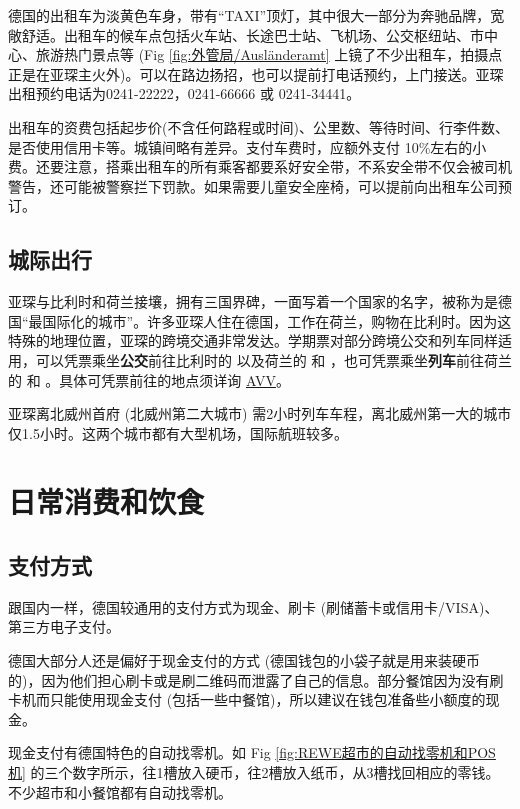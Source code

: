     德国的出租车为淡黄色车身，带有``TAXI''顶灯，其中很大一部分为奔驰品牌，宽敞舒适。出租车的候车点包括火车站、长途巴士站、飞机场、公交枢纽站、市中心、旅游热门景点等 (Fig \ref{fig:外管局/Ausländeramt} 上镜了不少出租车，拍摄点正是在亚琛主火外)。可以在路边扬招，也可以提前打电话预约，上门接送。亚琛出租预约电话为0241-22222，0241-66666 或 0241-34441。

    出租车的资费包括起步价(不含任何路程或时间)、公里数、等待时间、行李件数、是否使用信用卡等。城镇间略有差异。支付车费时，应额外支付 10\%左右的小费。还要注意，搭乘出租车的所有乘客都要系好安全带，不系安全带不仅会被司机警告，还可能被警察拦下罚款。如果需要儿童安全座椅，可以提前向出租车公司预订。

  \subsection{城际出行}\label{subsec:城际出行}

    亚琛与比利时和荷兰接壤，拥有三国界碑，一面写着一个国家的名字，被称为是德国``最国际化的城市''。许多亚琛人住在德国，工作在荷兰，购物在比利时。因为这特殊的地理位置，亚琛的跨境交通非常发达。学期票对部分跨境公交和列车同样适用，可以凭票乘坐\textbf{公交}前往比利时的  以及荷兰的  和 ，也可凭票乘坐\textbf{列车}前往荷兰的  和 。具体可凭票前往的地点须详询 \href{http://www.avv.de/}{AVV}。

    亚琛离北威州首府 (北威州第二大城市) 需2小时列车车程，离北威州第一大的城市仅1.5小时。这两个城市都有大型机场，国际航班较多。

\section{日常消费和饮食}\label{sec:日常消费和饮食}

  \subsection{支付方式}\label{subsec:支付方式}

    跟国内一样，德国较通用的支付方式为现金、刷卡 (刷储蓄卡或信用卡/VISA)、第三方电子支付。

    德国大部分人还是偏好于现金支付的方式 (德国钱包的小袋子就是用来装硬币的)，因为他们担心刷卡或是刷二维码而泄露了自己的信息。部分餐馆因为没有刷卡机而只能使用现金支付 (包括一些中餐馆)，所以建议在钱包准备些小额度的现金。

    现金支付有德国特色的自动找零机。如 Fig \ref{fig:REWE超市的自动找零机和POS机} 的三个数字所示，往1槽放入硬币，往2槽放入纸币，从3槽找回相应的零钱。不少超市和小餐馆都有自动找零机。

